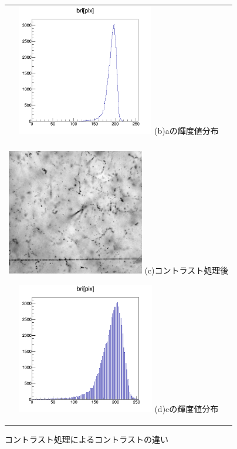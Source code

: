\documentclass[12pt,a4paper]{jarticle}
\begin{document}
\begin{figure}[htbp]
\begin{tabular}{c}
        \begin{minipage}{0.5\hsize}
          \centering
            \includegraphics[clip, width=60mm]{row_hist.png}
            \hspace{1.6cm} (b)aの輝度値分布
        \end{minipage}
        \\
        \\
        \begin{minipage}{0.5\hsize}
          \centering
              \includegraphics[clip, width=60mm]{cont.png}
              \hspace{1.6cm} (c)コントラスト処理後
          \end{minipage}
          
        \begin{minipage}{0.5\hsize}
          \centering
              \includegraphics[clip, width=60mm]{cont_hist.png}
              \hspace{1.6cm} (d)cの輝度値分布
        \end{minipage}
    
      \end{tabular}
      \caption{コントラスト処理によるコントラストの違い\label{fig:do_contrust_beforeandafter}}
\end{figure}
\end{document}
